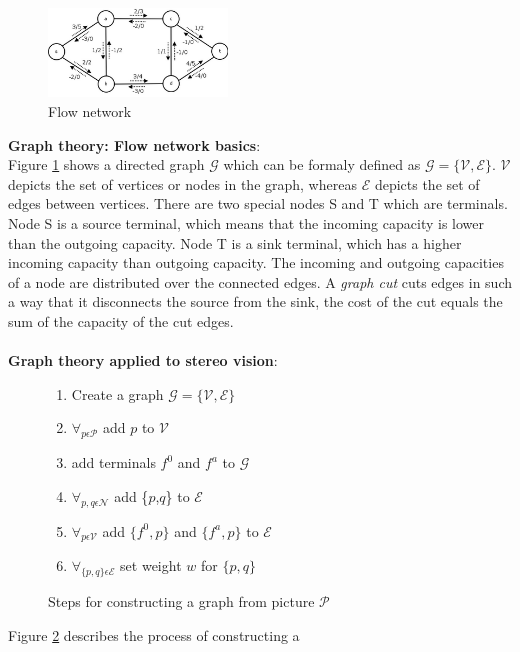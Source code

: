 \documentclass[a4paper]{article}
\begin{document}
\begin{figure}[t] \centering
\includegraphics[width=180px]{Network_flow.png}
\caption{Flow network}
\label{flow_network}
\end{figure}
\noindent\textbf{Graph theory: Flow network basics}:\indent\\
Figure \ref{flow_network} shows a directed graph $\mathcal{G}$ which
can be formaly defined as $\mathcal{G} = \{\mathcal{V},\mathcal{E}\}$.
$\mathcal{V}$ depicts the set of vertices or nodes in the graph,
whereas $\mathcal{E}$ depicts the set
of edges between vertices. There are two special nodes S and T which are terminals.
Node S is a source terminal, which means that the incoming capacity is lower
than the outgoing capacity. Node T is a sink terminal, which has a higher incoming capacity than outgoing capacity.
The incoming and outgoing capacities of a node are distributed over the connected edges.
A \emph{graph cut} cuts edges in such a way that it disconnects the source from the sink, the cost of the cut equals the sum of the capacity of
the cut edges.\\\\
\noindent\textbf{Graph theory applied to stereo vision}:\indent\\
\begin{figure}[h!bt]
\begin{enumerate}
 \item Create a graph $\mathcal{G} = \{\mathcal{V},\mathcal{E}\}$
 \item $\forall_{p \epsilon \mathcal{P}}$ add $p$ to $\mathcal{V}$
 \item add terminals $f^0$ and $f^a$ to $\mathcal{G}$
 \item $\forall_{p,q \epsilon \mathcal{N}}$ add \{$p$,$q$\} to $\mathcal{E}$
 \item $\forall_{p \epsilon \mathcal{V}}$ add $\{f^0,p\}$ and $\{f^a,p\}$ to $\mathcal{E}$
 \item $\forall_{\{p,q\} \epsilon \mathcal{E}}$ set weight $w$ for $\{p,q\}$
\end{enumerate}
\caption{Steps for constructing a graph from picture $\mathcal{P}$}
\label{alg:gc_construct}
\end{figure}
Figure \ref{alg:gc_construct} describes the process of constructing a
\end{document}
